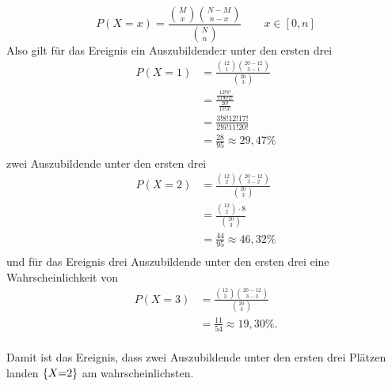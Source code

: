 \documentclass[main.tex]{subfiles}
\begin{document}
$$
    P(X{=}x) = \frac{\binom{M}{x}\binom{N-M}{n-x}}{\binom{N}{n}}\qquad x\in[0,n]
$$
Also gilt für das Ereignis ein Auszubildende:r unter den ersten drei
$$\begin{aligned}
    P(X{=}1) &= \frac{\binom{12}{1}\binom{20-12}{3-1}}{\binom{20}{3}} \\[3mm]
             &= \frac{\frac{12!8!}{11!6!2!}}{\frac{20!}{17!3!}} \\[3mm]
             &= \frac{3!8!12!17!}{2!6!11!20!} \\[3mm]
             &= \frac{28}{95} \approx 29,47\% \\
\end{aligned}$$
zwei Auszubildende unter den ersten drei
$$\begin{aligned}
    P(X{=}2) &= \frac{\binom{12}{2}\binom{20-12}{3-2}}{\binom{20}{3}} \\[2mm]
             &= \frac{\binom{12}{2}\cdot 8}{\binom{20}{3}} \\[2mm]
             &= \frac{44}{95} \approx 46,32\% \\
\end{aligned}$$
und für das Ereignis drei Auszubildende unter den ersten drei eine Wahrscheinlichkeit von
$$\begin{aligned}
    P(X{=}3) &= \frac{\binom{12}{3}\binom{20-12}{3-3}}{\binom{20}{3}} \\[2mm]
             &= \frac{11}{54} \approx 19,30\%. \\
\end{aligned}$$

Damit ist das Ereignis, dass zwei Auszubildende unter den ersten drei Plätzen landen $\set*{X{=}2}$ am wahrscheinlichsten. 
\end{document}
